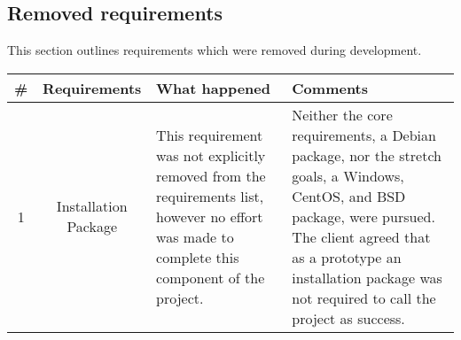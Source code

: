 \subsection{Removed requirements}

This section outlines requirements which were removed during development.

\begin{center}
  \begin{tabular}{ c | c | p{7cm} | p{6cm} }
    \hline
    \# & Requirements & What happened & Comments \\ \hline
    1 & Installation Package &
      This requirement was not explicitly removed from the requirements list, however no effort was made to complete this component of the project. & 
      Neither the core requirements, a Debian package, nor the stretch goals, a Windows, CentOS, and BSD package, were pursued.
      The client agreed that as a prototype an installation package was not required to call the project as success. \\ \hline
  \end{tabular}
\end{center}

